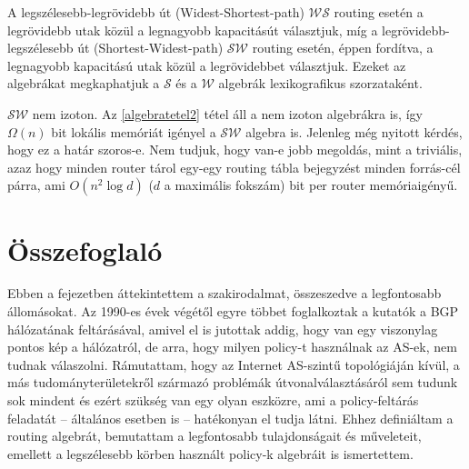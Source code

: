   A legszélesebb-legrövidebb út (Widest-Shortest-path) $\mathcal{WS}$ routing esetén a legrövidebb utak közül a legnagyobb kapacitásút választjuk\cite{Quality_of_service_based_routing_A_performance_perspective}, míg a legrövidebb-legszélesebb út (Shortest-Widest-path) $\mathcal{SW}$\cite{Quality_of_service_routing_for_supporting_multimedia_applications, On_path_selection_for_traffic_with_bandwidth_guarantees} routing esetén, éppen fordítva, a legnagyobb kapacitású utak közül a legrövidebbet választjuk. Ezeket az algebrákat megkaphatjuk a $\mathcal{S}$ és a $\mathcal{W}$ algebrák lexikografikus szorzataként\cite{Lexicographic_products_in_metarouting}.
  \begin{note}
    $\mathcal{SW}$ nem izoton. Az \eqref{algebratetel2} tétel áll a nem izoton algebrákra is, így $\Omega(n)$ bit lokális memóriát igényel a $\mathcal{SW}$ algebra is. Jelenleg még nyitott kérdés, hogy ez a határ szoros-e. Nem tudjuk, hogy van-e jobb megoldás, mint a triviális, azaz hogy minden router tárol egy-egy routing tábla bejegyzést minden forrás-cél párra, ami $O(n^2 \log d)$ ($d$ a maximális fokszám) bit per router memóriaigényű.
  \end{note}

  \section{Összefoglaló}\label{section_osszefoglalo1}
  Ebben a fejezetben áttekintettem a szakirodalmat, összeszedve a legfontosabb állomásokat. Az 1990-es évek végétől egyre többet foglalkoztak a kutatók a BGP hálózatának feltárásával, amivel el is jutottak addig, hogy van egy viszonylag pontos kép a hálózatról, de arra, hogy milyen policy-t használnak az AS-ek, nem tudnak válaszolni. Rámutattam, hogy az Internet AS-szintű topológiáján kívül, a más tudományterületekről származó problémák útvonalválasztásáról sem tudunk sok mindent és ezért szükség van egy olyan eszközre, ami a policy-feltárás feladatát -- általános esetben is -- hatékonyan el tudja látni. Ehhez definiáltam a routing algebrát, bemutattam a legfontosabb tulajdonságait és műveleteit, emellett a legszélesebb körben használt policy-k algebráit is ismertettem.
